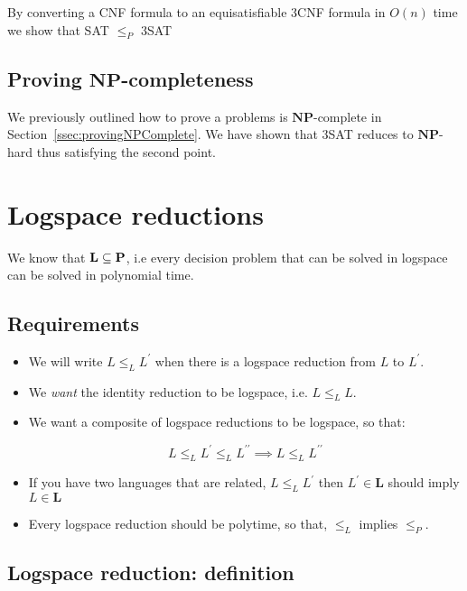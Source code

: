 \documentclass{article}
\newcommand{\NP}{\mathbf{NP}}
\begin{document}
By converting a CNF formula to an equisatisfiable 3CNF formula in $O(n)$ time we show that SAT $\leq_{P}$ 3SAT

\subsection{Proving $\NP$-completeness}
\label{subsec:provingNPcomplete}

We previously outlined how to prove a problems is $\NP$-complete in Section~\ref{ssec:provingNPComplete}. We have shown that 3SAT reduces to $\NP$-hard thus satisfying the second point.


\section{Logspace reductions}
\label{sec:logspace}

We know that $\bf L \subseteq P$, i.e every decision problem that can be solved in logspace can be solved in polynomial time.

\subsection{Requirements}
\label{subsec:req}
\begin{itemize}
  \item We will write $L \leq_{L} L^{\prime}$ when there is a logspace reduction from $L$ to $L^{\prime}$.
  \item We \textit{want} the identity reduction to be logspace, i.e. $L \leq_{L} L$.
  \item We want a composite of logspace reductions to be logspace, so that:

        \[
        L\leq_{L}L^{\prime}\leq_{L}L^{\prime\prime} \implies L \leq_{L} L^{\prime\prime}
        \]

        \item If you have two languages that are related, $L \leq_{L} L^{'}$ then $L^{\prime} \in \mathbf{L} $ should imply $L \in \mathbf{L} $
  \item Every logspace reduction should be polytime, so that, $\leq_{L}$ implies $\leq_{P}$.
\end{itemize}


\subsection{Logspace reduction: definition}
\label{subsec:ls-definition}
\end{document}
